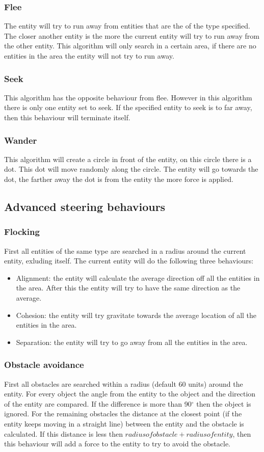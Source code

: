 \documentclass[10pt]{extarticle} %
\begin{document}
   \subsubsection {Flee}
   The entity will try to run away from entities that are the of the type specified. The closer another entity is the more the current entity will try to run away from the other entity. This algorithm will only search in a certain area, if there are no entities in the area the entity will not try to run away.
   \subsubsection {Seek}
   This algorithm has the opposite behaviour from flee. However in this algorithm there is only one entity set to seek. If the specified entity to seek is to far away, then this behaviour will terminate itself.
   \subsubsection {Wander}
  This algorithm will create a circle in front of the entity, on this circle there is a dot. This dot will move randomly along the circle. The entity will go towards the dot, the farther away the dot is from the entity the more force is applied. 
  \subsection{Advanced steering behaviours}
  \subsubsection {Flocking}
  First all entities of the same type are searched in a radius around the current entity, exluding itself. The current entity will do the following three behaviours: 
  \begin{itemize}
  \item Alignment: the entity will calculate the average direction off all the entities in the area. After this the entity will try to have the same direction as the average.
  \item Cohesion: the entity will try gravitate towards the average location of all the entities in the area.
  \item Separation: the entity  will try to go away from all the entities in the area. 
  \end{itemize}
  \subsubsection {Obstacle avoidance}
  First all obstacles are searched within a radius (default 60 units) around the entity. For every object the angle from the entity to the object and the direction of the entity are compared. If the difference is more than 90$^{\circ}$ then the object is ignored. For the remaining obstacles the distance at the closest point (if the entity keeps moving in a straight line) between the entity and the obstacle is calculated. If this distance is less then \(radius of obstacle + radius of entity\), then this behaviour will add a force to the entity to try to avoid the obstacle.
\end{document}
